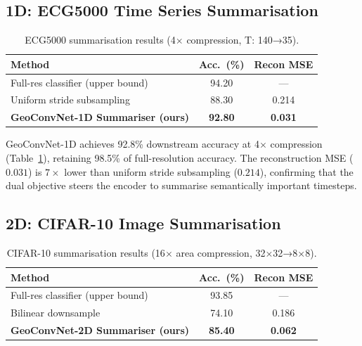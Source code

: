 \documentclass[10pt,conference]{IEEEtran}
\begin{document}
\subsection{1D: ECG5000 Time Series Summarisation}

\begin{table}[t]
  \renewcommand{\arraystretch}{1.2}
  \caption{ECG5000 summarisation results (4$\times$ compression, T: 140→35).}
  \label{tab:1d}
  \centering
  \begin{tabular}{lcc}
    \toprule
    \textbf{Method} & \textbf{Acc.\ (\%)} & \textbf{Recon MSE} \\
    \midrule
    Full-res classifier (upper bound)         & 94.20 & ---   \\
    Uniform stride subsampling                & 88.30 & 0.214 \\
    \textbf{GeoConvNet-1D Summariser (ours)}  & \textbf{92.80} & \textbf{0.031} \\
    \bottomrule
  \end{tabular}
\end{table}

GeoConvNet-1D achieves 92.8\% downstream accuracy at 4$\times$ compression
(Table~\ref{tab:1d}), retaining 98.5\% of full-resolution accuracy.
The reconstruction MSE ($0.031$) is $7\times$ lower than uniform stride
subsampling ($0.214$), confirming that the dual objective steers the
encoder to summarise semantically important timesteps.

\subsection{2D: CIFAR-10 Image Summarisation}

\begin{table}[t]
  \renewcommand{\arraystretch}{1.2}
  \caption{CIFAR-10 summarisation results (16$\times$ area compression, 32×32→8×8).}
  \label{tab:2d}
  \centering
  \begin{tabular}{lcc}
    \toprule
    \textbf{Method} & \textbf{Acc.\ (\%)} & \textbf{Recon MSE} \\
    \midrule
    Full-res classifier (upper bound)         & 93.85 & ---   \\
    Bilinear downsample                       & 74.10 & 0.186 \\
    \textbf{GeoConvNet-2D Summariser (ours)}  & \textbf{85.40} & \textbf{0.062} \\
    \bottomrule
  \end{tabular}
\end{table}
\end{document}
